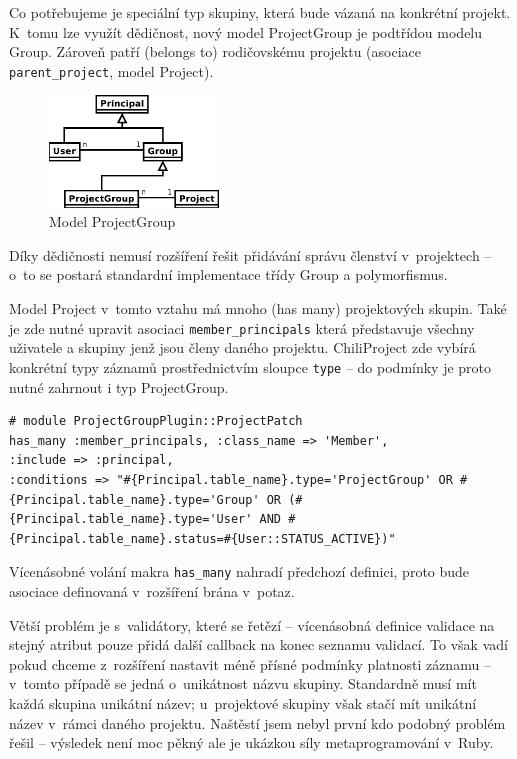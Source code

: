 \documentclass[thesis=B,czech]{FITthesis}[2012/05/02]
\begin{document}
Co potřebujeme je speciální typ skupiny, která bude vázaná na konkrétní
projekt. K~tomu lze využít dědičnost, nový model ProjectGroup je
podtřídou modelu Group. Zároveň patří (belongs to) rodičovskému projektu
(asociace \lstinline!parent_project!, model Project).

\begin{figure}[bp]
\centering
\includegraphics[width=0.4\textwidth]{group-er3.pdf}
\caption{Model ProjectGroup}
\end{figure}

Díky dědičnosti nemusí rozšíření řešit přidávání správu členství
v~projektech -- o~to se postará standardní implementace třídy Group a
polymorfismus.

Model Project v~tomto vztahu má mnoho (has many) projektových skupin.
Také je zde nutné upravit asociaci \lstinline!member_principals! která
představuje všechny uživatele a skupiny jenž jsou členy daného projektu.
ChiliProject zde vybírá konkrétní typy záznamů prostřednictvím sloupce
\lstinline!type! -- do podmínky je proto nutné zahrnout i typ
ProjectGroup.

\begin{lstlisting}
# module ProjectGroupPlugin::ProjectPatch
has_many :member_principals, :class_name => 'Member',
:include => :principal,
:conditions => "#{Principal.table_name}.type='ProjectGroup' OR #{Principal.table_name}.type='Group' OR (#{Principal.table_name}.type='User' AND #{Principal.table_name}.status=#{User::STATUS_ACTIVE})"
\end{lstlisting}
Vícenásobné volání makra \lstinline!has_many! nahradí předchozí
definici, proto bude asociace definovaná v~rozšíření brána v~potaz.

Větší problém je s~validátory, které se řetězí -- vícenásobná definice
validace na stejný atribut pouze přidá další \gls{callback} na konec
seznamu validací. To však vadí pokud chceme z~rozšíření nastavit méně
přísné podmínky platnosti záznamu -- v~tomto případě se jedná
o~unikátnost názvu skupiny. Standardně musí mít každá skupina unikátní
název; u~projektové skupiny však stačí mít unikátní název v~rámci daného
projektu. Naštěstí jsem nebyl první kdo podobný problém řešil
\citep{McAlpin2011} -- výsledek není moc pěkný ale je ukázkou síly
metaprogramování v~Ruby.
\end{document}
